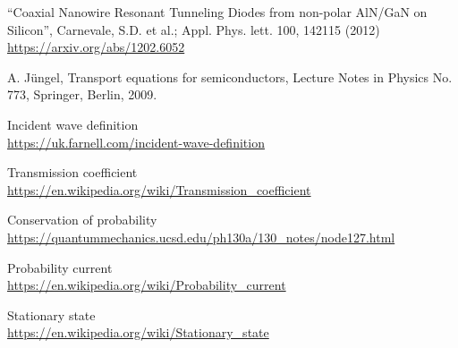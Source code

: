 \documentclass[12pt,a4paper,onecolumn]{article}
\theoremstyle{definition}
\theoremstyle{plain}
\begin{document}
\newpage





\begin{thebibliography}{99}
``Coaxial Nanowire Resonant Tunneling Diodes from non-polar AlN/GaN on Silicon'', Carnevale, S.D. et al.; Appl. Phys. lett. 100, 142115 (2012) \\
\href{https://arxiv.org/abs/1202.6052}{\footnotesize https://arxiv.org/abs/1202.6052}

A. Jüngel, Transport equations for semiconductors, Lecture Notes in Physics No. 773, Springer, Berlin, 2009.

Incident wave definition\\
\href{https://uk.farnell.com/incident-wave-definition}{\footnotesize https://uk.farnell.com/incident-wave-definition}

Transmission coefficient\\
\href{https://en.wikipedia.org/wiki/Transmission\_coefficient}{\footnotesize https://en.wikipedia.org/wiki/Transmission\_coefficient} 

Conservation of probability\\
\href{https://quantummechanics.ucsd.edu/ph130a/130\_notes/node127.html}{\footnotesize https://quantummechanics.ucsd.edu/ph130a/130\_notes/node127.html}

Probability current \\
\href{https://en.wikipedia.org/wiki/Probability\_current}{\footnotesize https://en.wikipedia.org/wiki/Probability\_current}

Stationary state \\
\href{https://en.wikipedia.org/wiki/Stationary\_state}{ \footnotesize https://en.wikipedia.org/wiki/Stationary\_state}
\end{thebibliography}
\end{document}
